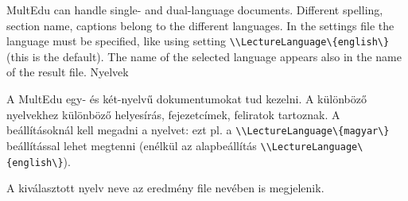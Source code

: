 {
MultEdu can handle single- and dual-language documents.
Different spelling, section name, captions belong to the different languages. In the settings file the language must be specified,
like using setting \lstinline|\\LectureLanguage\{english\}| (this is the default).
The name of the selected language appears also in the name of the result file.
}
{Nyelvek}
{
A MultEdu egy- és két-nyelvű dokumentumokat tud kezelni.
A különböző nyelvekhez különböző helyesírás, fejezetcímek, feliratok tartoznak. A beállításoknál kell megadni a nyelvet: ezt pl. a \lstinline|\\LectureLanguage\{magyar\}| beállítással lehet megtenni
(enélkül az alapbeállítás \lstinline|\\LectureLanguage\{english\}|).

A kiválasztott nyelv neve az eredmény file nevében is megjelenik.
}

